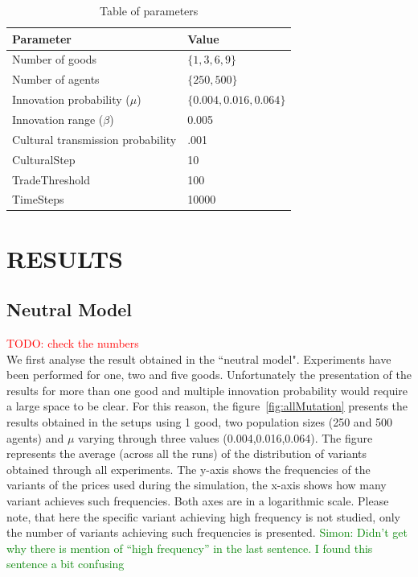 \documentclass{wscpaperproc}
\newcommand{\memo}[2]{\textcolor{#1}{#2}}
\newcommand{\todo}[1]{\memo{red}{TODO: #1\\}}
\newcommand{\simon}[1]{\memo{green}{Simon: #1\\}}
\begin{document}

\begin{table}
\begin{center}
\begin{tabular}{@{}ll@{}}
\toprule
Parameter & Value \\
\midrule
Number of goods & $\{1,3,6,9\}$ \\
Number of agents & $\{250,500\}$ \\
Innovation probability ($\mu$) & $\{0.004,0.016,0.064\}$ \\
Innovation range ($\beta$) & 0.005\\
Cultural transmission probability & .001\\
CulturalStep &  10 \\
TradeThreshold & 100  \\
TimeSteps & 10000 \\
\bottomrule
\end{tabular}
\caption{Table of parameters}\label{tab:parameters}
\end{center}
\end{table}






\section{RESULTS}
\subsection{Neutral Model}

\todo{check the numbers}
We first analyse the result obtained in the ``neutral model". Experiments have been performed for one, two and five goods. Unfortunately the presentation of the results for more than one good and multiple innovation probability would require a large space to be clear. For this reason, the figure~\ref{fig:allMutation} presents the results obtained in the setups using 1 good, two population sizes (250 and 500 agents) and $\mu$ varying through three values (0.004,0.016,0.064). The figure represents the average (across all the runs) of the distribution of variants obtained through all experiments. The y-axis shows the frequencies of the variants of the prices used during the simulation, the x-axis shows how many variant achieves such frequencies. Both axes are in a logarithmic scale. Please note, that here the specific variant achieving high frequency is not studied, only the number of variants achieving such frequencies is presented.
\simon{Didn't get why there is mention of ``high frequency'' in the last sentence. I found this sentence a bit confusing }
\end{document}

